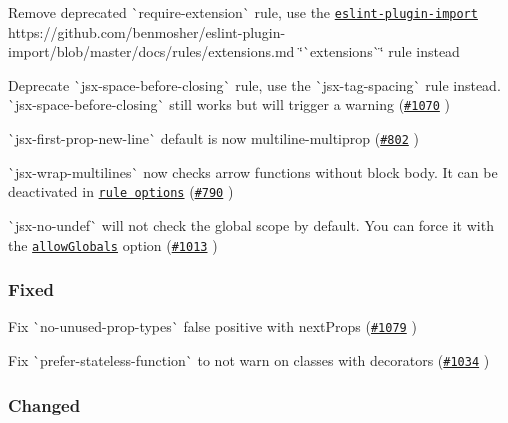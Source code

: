 \begin{DoxyItemize}
\item Remove deprecated \`{}require-\/extension\`{} rule, use the \href{https://github.com/benmosher/eslint-plugin-import}{\tt eslint-\/plugin-\/import} https\+://github.com/benmosher/eslint-\/plugin-\/import/blob/master/docs/rules/extensions.\+md \char`\"{}\`{}extensions\`{}\char`\"{} rule instead
\item Deprecate \`{}jsx-\/space-\/before-\/closing\`{} rule, use the \`{}jsx-\/tag-\/spacing\`{} rule instead. \`{}jsx-\/space-\/before-\/closing\`{} still works but will trigger a warning (\href{https://github.com/yannickcr/eslint-plugin-react/pull/1070}{\tt \#1070} )
\item \`{}jsx-\/first-\/prop-\/new-\/line\`{} default is now {\ttfamily multiline-\/multiprop} (\href{https://github.com/yannickcr/eslint-plugin-react/pull/802}{\tt \#802} )
\item \`{}jsx-\/wrap-\/multilines\`{} now checks arrow functions without block body. It can be deactivated in \href{docs/rules/jsx-wrap-multilines.md#rule-details}{\tt rule options} (\href{https://github.com/yannickcr/eslint-plugin-react/issues/790}{\tt \#790} )
\item \`{}jsx-\/no-\/undef\`{} will not check the global scope by default. You can force it with the \href{docs/rules/jsx-no-undef.md#allowglobals}{\tt {\ttfamily allow\+Globals}} option (\href{https://github.com/yannickcr/eslint-plugin-react/pull/1013}{\tt \#1013} )
\end{DoxyItemize}

\subsubsection*{Fixed}


\begin{DoxyItemize}
\item Fix \`{}no-\/unused-\/prop-\/types\`{} false positive with {\ttfamily next\+Props} (\href{https://github.com/yannickcr/eslint-plugin-react/issues/1079}{\tt \#1079} )
\item Fix \`{}prefer-\/stateless-\/function\`{} to not warn on classes with decorators (\href{https://github.com/yannickcr/eslint-plugin-react/issues/1034}{\tt \#1034} )
\end{DoxyItemize}

\subsubsection*{Changed}


